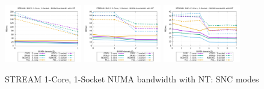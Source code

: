 \documentclass{article}
\begin{document}
\begin{figure}[!ht]
    \centering
    \includegraphics[width=0.3\textwidth]{../data/icx-32c-snc/mem_bw_numa/SNC-1_numa_nps1_compact_nt}
    \includegraphics[width=0.3\textwidth]{../data/icx-32c-snc/mem_bw_numa/SNC-2_numa_nps2_compact_nt}
    \includegraphics[width=0.3\textwidth]{../data/icx-32c-snc/mem_bw_numa/SNC-4_numa_nps4_compact_nt}
    \caption{STREAM 1-Core, 1-Socket NUMA bandwidth with NT: SNC modes}
    \label{figure:mem_bw_numa_nt_icx_snc}
\end{figure}

\clearpage
\end{document}
